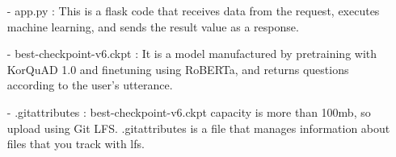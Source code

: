 \documentclass[conference]{IEEEtran}
\begin{document}
\begin{enumerate}
        \item [-] app.py : This is a flask code that receives data from the request, executes machine learning, and sends the result value as a response.\\
        \item [-] best-checkpoint-v6.ckpt : It is a model manufactured by pretraining with KorQuAD 1.0 and finetuning using RoBERTa, and returns questions according to the user's utterance.\\
        \item [-] .gitattributes : best-checkpoint-v6.ckpt capacity is more than 100mb, so upload using Git LFS. .gitattributes is a file that manages information about files that you track with lfs.\\
\end{enumerate}
\end{document}
